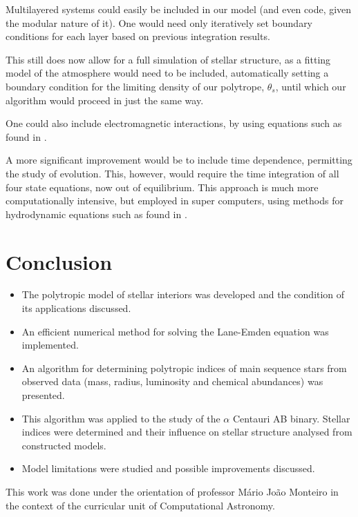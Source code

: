 \documentclass{aa}
\begin{document}
Multilayered systems could easily be included in our model (and even code, given
the modular nature of it). One would need only iteratively set boundary
conditions for each layer based on previous integration results.

This still does now allow for a full simulation of stellar structure, as a
fitting model of the atmosphere would need to be included, automatically setting
a boundary condition for the limiting density of our polytrope, $\theta_s$,
until which our algorithm would proceed in just the same way.

One could also include electromagnetic interactions, by using equations such as
found in \cite{takisa_charged_2013}.

A more significant improvement would be to include time dependence, permitting
the study of evolution. This, however, would require the time integration of
all four state equations, now out of equilibrium. This approach is much more
computationally intensive, but employed in super computers, using methods for
hydrodynamic equations such as found in \cite{kifonidis_multigrid_2012}.

\section{Conclusion}

\begin{itemize}
\item The polytropic model of stellar interiors was developed and the condition
  of its applications discussed.
\item An efficient numerical method for solving the Lane-Emden equation was implemented.
\item An algorithm for determining polytropic indices of main sequence stars
  from observed data (mass, radius, luminosity and chemical abundances) was presented.
\item This algorithm was applied to the study of the $\alpha$ Centauri AB
  binary. Stellar indices were determined and their influence on stellar
  structure analysed from constructed models.
\item Model limitations were studied and possible improvements discussed.
\end{itemize}

\begin{acknowledgements}
  This work was done under the orientation of professor Mário João Monteiro in the
  context of the curricular unit of Computational Astronomy.
\end{acknowledgements}



\end{document}
